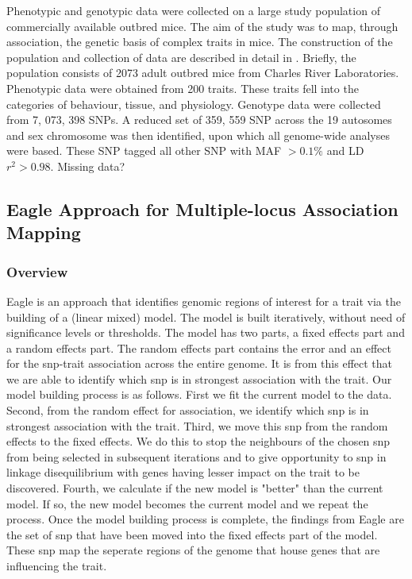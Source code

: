 \documentclass{nature}
\begin{document}
Phenotypic and genotypic data were collected on a large study population of commercially 
available outbred mice. The aim of the study was to map, through association, the genetic basis
of complex traits in mice. The construction of the population and collection of data are described in detail in 
\cite{nicod2016genome}.  Briefly, the population consists of 2073 adult outbred mice from Charles River Laboratories. Phenotypic data
were obtained from 200 traits. These traits fell into the categories of behaviour, tissue, and physiology. Genotype 
data were collected from 7, 073, 398 SNPs.  A reduced set of 359, 559 SNP across the 19 
autosomes and sex chromosome was then identified, upon which all genome-wide analyses were based.  These SNP tagged all other SNP with MAF $> 0.1\%$
and LD $r^2 > 0.98$.  Missing data?

\subsection{Eagle Approach for Multiple-locus Association Mapping}
\subsubsection{Overview}


Eagle is an approach that identifies genomic regions of interest for a trait via the building of a (linear mixed) model. The model is built iteratively, without need of significance levels or thresholds. The model has two parts, a fixed effects part and a random effects part. The random effects part contains the error and an effect for the snp-trait association across the entire genome. It is from this effect 
 that we are able to identify which snp is in strongest association with the trait.  
 Our model building process is as follows. First we fit the current model to the data. Second, from the random effect for association, we identify which snp is in strongest association  with the trait.  Third, we move this snp from the random effects to the fixed effects.
We do this to stop the neighbours of the chosen snp from being selected in subsequent iterations and 
to give opportunity to snp in linkage disequilibrium with genes having lesser impact on the trait to be discovered. 
 Fourth, we calculate if the new model is "better" than the current model. 
If so,  the new model becomes the current model and we repeat the process.   Once the model building process is complete, the findings from Eagle are the set of snp that have been moved into the fixed effects part of the model.  These snp map the seperate regions of the genome that house genes that are influencing the trait.  
 
\end{document}
